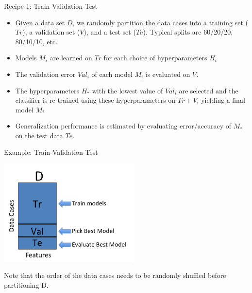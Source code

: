 \documentclass[serif,xcolor=pdftex,dvipsnames,table,hyperref={bookmarks=false}]{beamer}
\begin{document}
\begin{frame}[t]{Recipe 1: Train-Validation-Test}
\begin{itemize}
\setlength{\itemsep}{6pt}

\item Given a data set $D$, we randomly partition the data cases into a training set ($Tr$), a validation set ($V$), and a test set ($Te$). Typical splits are 60/20/20, 80/10/10, etc. 

\pause\item Models $M_i$ are learned on $Tr$ for each choice of hyperparameters $H_i$

\pause\item The validation error $Val_i$ of each model $M_i$ is evaluated on $V$.

\pause\item The hyperparameters $H_*$ with the lowest value of $Val_i$ are selected and the classifier is re-trained using these hyperparameters on $Tr+V$, yielding a final model $M_*$

\pause\item Generalization performance is estimated by evaluating error/accuracy of $M_*$ on the test data $Te$.

\end{itemize}
\end{frame}


\begin{frame}[t]{Example: Train-Validation-Test}

\center
\includegraphics[width=2.8in]{../Figures/model-selection-tr-val-te.png}

Note that the order of the data cases needs to be randomly
shuffled before partitioning D.

\end{frame}
\end{document}
